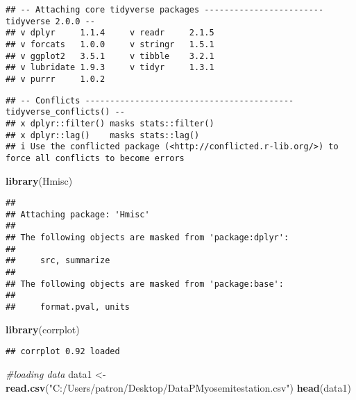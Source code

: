 \documentclass[
]{article}
\newenvironment{Shaded}{\begin{snugshade}}{\end{snugshade}}
\newcommand{\CommentTok}[1]{\textcolor[rgb]{0.56,0.35,0.01}{\textit{#1}}}
\newcommand{\FunctionTok}[1]{\textcolor[rgb]{0.13,0.29,0.53}{\textbf{#1}}}
\newcommand{\NormalTok}[1]{#1}
\newcommand{\OtherTok}[1]{\textcolor[rgb]{0.56,0.35,0.01}{#1}}
\newcommand{\StringTok}[1]{\textcolor[rgb]{0.31,0.60,0.02}{#1}}
\begin{document}
\begin{verbatim}
## -- Attaching core tidyverse packages ------------------------ tidyverse 2.0.0 --
## v dplyr     1.1.4     v readr     2.1.5
## v forcats   1.0.0     v stringr   1.5.1
## v ggplot2   3.5.1     v tibble    3.2.1
## v lubridate 1.9.3     v tidyr     1.3.1
## v purrr     1.0.2
\end{verbatim}

\begin{verbatim}
## -- Conflicts ------------------------------------------ tidyverse_conflicts() --
## x dplyr::filter() masks stats::filter()
## x dplyr::lag()    masks stats::lag()
## i Use the conflicted package (<http://conflicted.r-lib.org/>) to force all conflicts to become errors
\end{verbatim}

\begin{Shaded}
\begin{Highlighting}[]
\FunctionTok{library}\NormalTok{(Hmisc)}
\end{Highlighting}
\end{Shaded}

\begin{verbatim}
## 
## Attaching package: 'Hmisc'
## 
## The following objects are masked from 'package:dplyr':
## 
##     src, summarize
## 
## The following objects are masked from 'package:base':
## 
##     format.pval, units
\end{verbatim}

\begin{Shaded}
\begin{Highlighting}[]
\FunctionTok{library}\NormalTok{(corrplot)}
\end{Highlighting}
\end{Shaded}

\begin{verbatim}
## corrplot 0.92 loaded
\end{verbatim}

\begin{Shaded}
\begin{Highlighting}[]
\CommentTok{\#loading data}
\NormalTok{data1 }\OtherTok{\textless{}{-}} \FunctionTok{read.csv}\NormalTok{(}\StringTok{"C:/Users/patron/Desktop/DataPMyosemitestation.csv"}\NormalTok{)}
\FunctionTok{head}\NormalTok{(data1)}
\end{Highlighting}
\end{Shaded}
\end{document}
